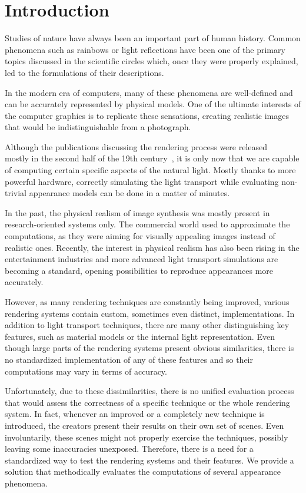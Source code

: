 \chapter*{Introduction}

Studies of nature have always been an important part of human history. Common phenomena such as rainbows or light reflections have been one of the primary topics discussed in the scientific circles which, once they were properly explained, led to the formulations of their descriptions.

In the modern era of computers, many of these phenomena are well-defined and can be accurately represented by physical models. One of the ultimate interests of the computer graphics is to replicate these sensations, creating realistic images that would be indistinguishable from a photograph.

Although the publications discussing the rendering process were released \\ mostly in the second half of the 19th century~\cite{kajiya1986rendering}\cite{nicodemus1965directional}, it is only now that we are capable of computing certain specific aspects of the natural light. Mostly thanks to more powerful hardware, correctly simulating the light transport while evaluating non-trivial appearance models can be done in a matter of minutes.

In the past, the physical realism of image synthesis was mostly present in research-oriented systems only. The commercial world used to approximate the computations, as they were aiming for visually appealing images instead of realistic ones. Recently, the interest in physical realism has also been rising in the entertainment industries and more advanced light transport simulations are becoming a standard, opening possibilities to reproduce appearances more accurately.

However, as many rendering techniques are constantly being improved, various rendering systems contain custom, sometimes even distinct, implementations. In addition to light transport techniques, there are many other distinguishing key features, such as material models or the internal light representation. Even though large parts of the rendering systems present obvious similarities, there is no standardized implementation of any of these features and so their computations may vary in terms of accuracy.

Unfortunately, due to these dissimilarities, there is no unified evaluation process that would assess the correctness of a specific technique or the whole rendering system. In fact, whenever an improved or a completely new technique is introduced, the creators present their results on their own set of scenes. Even involuntarily, these scenes might not properly exercise the techniques, possibly leaving some inaccuracies unexposed. Therefore, there is a need for a standardized way to test the rendering systems and their features. We provide a solution that methodically evaluates the computations of several appearance phenomena.

